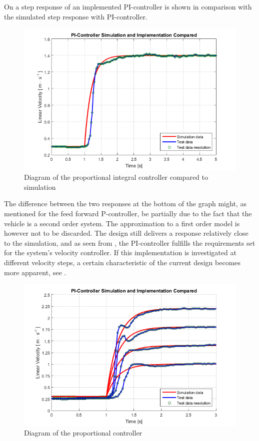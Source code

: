 On  a step response of an implemented PI-controller is shown in comparison with the simulated step response with PI-controller.
%
\begin{figure}[H]
 	\centering
 	\includegraphics[width=.8\textwidth]{figures/PIcontrollerStepRealVsSim}
 	\caption{Diagram of the proportional integral controller compared to simulation}
 	\label{fig:PIcontrollerStepRealVsSim}
\end{figure}
%
The difference between the two responses at the bottom of the graph might, as mentioned for the feed forward P-controller, be partially due to the fact that the vehicle is a second order system. The approximation to a first order model is however not to be discarded. The design still delivers a response relatively close to the simulation, and as seen from , the PI-controller fulfills the requirements set for the system's velocity controller.
If this implementation is investigated at different velocity steps, a certain characteristic of the current design becomes more apparent, see .
%
\begin{figure}[H]
 	\centering
 	\includegraphics[width=.8\textwidth]{figures/multiStepPI}
 	\caption{Diagram of the proportional controller}
 	\label{fig:multiStepPI}
\end{figure}
